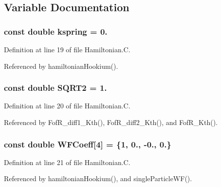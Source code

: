 \subsection{Variable Documentation}
\hypertarget{_hamiltonian_8_c_a38ea2cbc62615007f27ca01aebdc04a8}{
\subsubsection[{kspring}]{\setlength{\rightskip}{0pt plus 5cm}const double kspring = 0.}}\label{_hamiltonian_8_c_a38ea2cbc62615007f27ca01aebdc04a8}


Definition at line 19 of file Hamiltonian.\-C.



Referenced by hamiltonian\-Hookium().

\hypertarget{_hamiltonian_8_c_a0dac55511b8235578f5364bcd618056f}{
\subsubsection[{S\-Q\-R\-T2}]{\setlength{\rightskip}{0pt plus 5cm}const double S\-Q\-R\-T2 = 1.}}\label{_hamiltonian_8_c_a0dac55511b8235578f5364bcd618056f}


Definition at line 20 of file Hamiltonian.\-C.



Referenced by Fof\-R\-\_\-diff1\-\_\-\-Kth(), Fof\-R\-\_\-diff2\-\_\-\-Kth(), and Fof\-R\-\_\-\-Kth().

\hypertarget{_hamiltonian_8_c_a9e3e25918df4dde4f87afaba7778d262}{
\subsubsection[{W\-F\-Coeff}]{\setlength{\rightskip}{0pt plus 5cm}const double W\-F\-Coeff\mbox{[}4\mbox{]} = \{1, 0., -\/0., 0.\}}}\label{_hamiltonian_8_c_a9e3e25918df4dde4f87afaba7778d262}


Definition at line 21 of file Hamiltonian.\-C.



Referenced by hamiltonian\-Hookium(), and single\-Particle\-W\-F().

